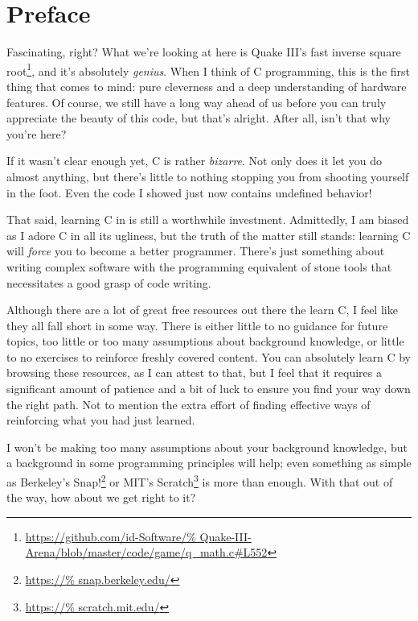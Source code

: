%

\chapter{Preface}


\noindent
Fascinating, right?  What we're looking at here is Quake III's fast
inverse square root\footnote{\url{https://github.com/id-Software/%
Quake-III-Arena/blob/master/code/game/q_math.c\#L552}}, and it's
absolutely \emph{genius}.  When I think of C programming, this is the
first thing that comes to mind: pure cleverness and a deep understanding
of hardware features.  Of course, we still have a long way ahead of us
before you can truly appreciate the beauty of this code, but that's
alright.  After all, isn't that why you're here?

If it wasn’t clear enough yet, C is rather \emph{bizarre}.  Not only
does it let you do almost anything, but there’s little to nothing
stopping you from shooting yourself in the foot.  Even the code I showed
just now contains undefined behavior!

That said, learning C in  is still a
worthwhile investment.  Admittedly, I am biased as I adore C in all its
ugliness, but the truth of the matter still stands: learning C will
\emph{force} you to become a better programmer.  There’s just something
about writing complex software with the programming equivalent of stone
tools that necessitates a good grasp of code writing.

Although there are a lot of great free resources out there the learn C,
I feel like they all fall short in some way.  There is either little to
no guidance for future topics, too little or too many assumptions about
background knowledge, or little to no exercises to reinforce freshly
covered content.  You can absolutely learn C by browsing these
resources, as I can attest to that, but I feel that it requires a
significant amount of patience and a bit of luck to ensure you find your
way down the right path.  Not to mention the extra effort of finding
effective ways of reinforcing what you had just learned.

I won’t be making too many assumptions about your background knowledge,
but a background in some programming principles will help; even
something as simple as Berkeley’s Snap!\footnote{\url{https://%
snap.berkeley.edu/}} or MIT’s Scratch\footnote{\url{https://%
scratch.mit.edu/}} is more than enough.  With that out of the way, how
about we get right to it?
